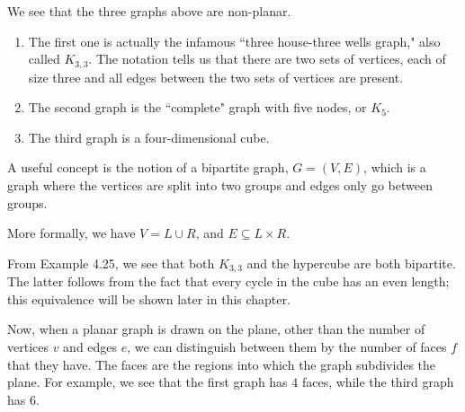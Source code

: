 \documentclass[openany]{book}
\begin{document}
\begin{example}
\begin{center}
	\end{center}
	
	We see that the three graphs above are non-planar. 
	
	\begin{enumerate}
		\item The first one is actually the infamous ``three house-three wells graph," also called $K_{3,3}$. The notation tells us that there are two sets of vertices, each of size three and all edges between the two sets of vertices are present.
	
		\item The second graph is the ``complete" graph with five nodes, or $K_{5}$.
	
		\item The third graph is a four-dimensional cube.
	\end{enumerate}
\end{example}

\begin{defn}
	A useful concept is the notion of a bipartite graph, $G=(V,E)$, which is a graph where the vertices are split into two groups and edges only go between groups.
	
	More formally, we have $V = L \cup R$, and $E \subseteq L \times R$.
\end{defn}

From Example 4.25, we see that both $K_{3,3}$ and the hypercube are both bipartite. The latter follows from the fact that every cycle in the cube has an even length; this equivalence will be shown later in this chapter.

Now, when a planar graph is drawn on the plane, other than the number of vertices $v$ and edges $e$, we can distinguish between them by the number of faces $f$ that they have. The faces are the regions into which the graph subdivides the plane. For example, we see that the first graph has $4$ faces, while the third graph has $6$.
\end{document}
